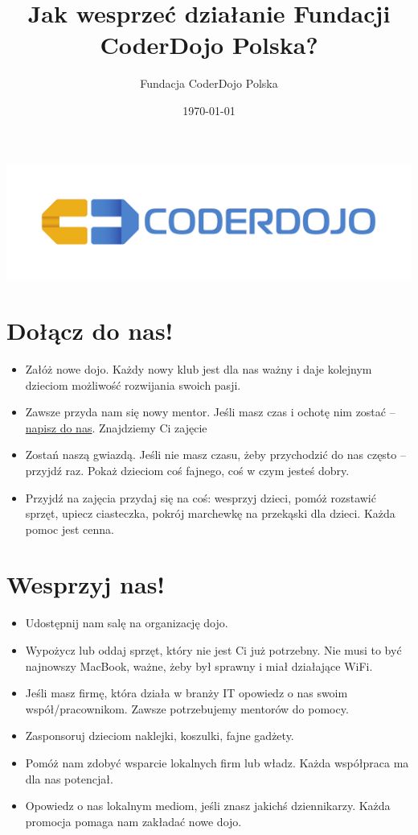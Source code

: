 \documentclass[a4paper]{article}
\title{Jak wesprzeć działanie Fundacji CoderDojo Polska?}
\author{Fundacja CoderDojo Polska}
\date{\today}
\begin{document}
\maketitle
\includegraphics[width=\textwidth]{logo_CD.pdf}


\section{Dołącz do nas!}
\begin{itemize}
\item Załóż nowe dojo. Każdy nowy klub jest dla nas ważny i daje kolejnym dzieciom możliwość rozwijania swoich pasji. 
\item Zawsze przyda nam się nowy mentor. Jeśli masz czas i ochotę nim zostać – \href{mailto:dojo@coderdojo.org.pl}{napisz do nas}. Znajdziemy Ci zajęcie 
\item Zostań naszą gwiazdą. Jeśli nie masz czasu, żeby przychodzić do nas często – przyjdź raz. Pokaż dzieciom coś fajnego, coś w czym jesteś dobry. 
\item Przyjdź na zajęcia przydaj się na coś: wesprzyj dzieci, pomóż rozstawić sprzęt, upiecz ciasteczka, pokrój marchewkę na przekąski dla dzieci. Każda pomoc jest cenna. 
\end{itemize}

\section{Wesprzyj nas!}
\begin{itemize}
\item Udostępnij nam salę na organizację dojo. 
\item Wypożycz lub oddaj sprzęt, który nie jest Ci już potrzebny. Nie musi to być najnowszy MacBook, ważne, żeby był sprawny i miał działające WiFi. 
\item Jeśli masz firmę, która działa w branży IT opowiedz o nas swoim współ/pracownikom. Zawsze potrzebujemy mentorów do pomocy. 
\item Zasponsoruj dzieciom naklejki, koszulki, fajne gadżety. 
\item Pomóż nam zdobyć wsparcie lokalnych firm lub władz. Każda współpraca ma dla nas potencjał. 
\item Opowiedz o nas lokalnym mediom, jeśli znasz jakichś dziennikarzy. Każda promocja pomaga nam zakładać nowe dojo.
\end{itemize}
\end{document}
